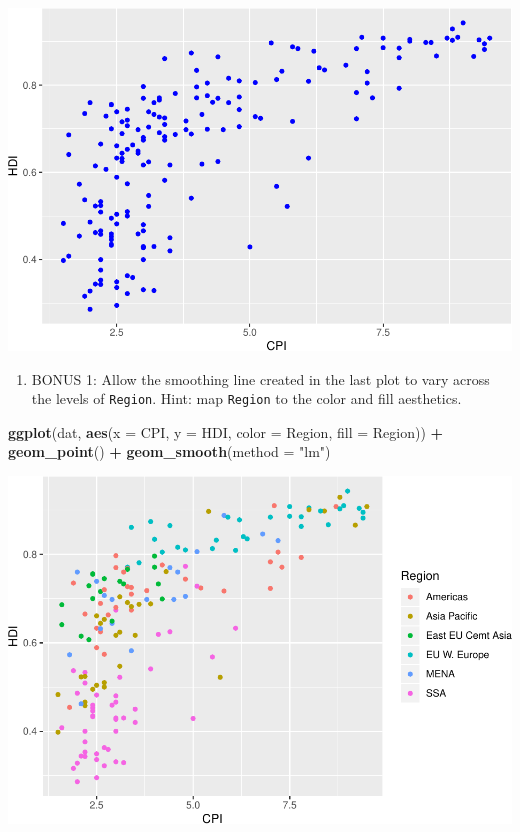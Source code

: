 \documentclass[
]{book}
\newenvironment{Shaded}{\begin{snugshade}}{\end{snugshade}}
\newcommand{\DataTypeTok}[1]{\textcolor[rgb]{0.13,0.29,0.53}{#1}}
\newcommand{\KeywordTok}[1]{\textcolor[rgb]{0.13,0.29,0.53}{\textbf{#1}}}
\newcommand{\NormalTok}[1]{#1}
\newcommand{\OperatorTok}[1]{\textcolor[rgb]{0.81,0.36,0.00}{\textbf{#1}}}
\newcommand{\StringTok}[1]{\textcolor[rgb]{0.31,0.60,0.02}{#1}}
\providecommand{\tightlist}{%
  \setlength{\itemsep}{0pt}\setlength{\parskip}{0pt}}
\begin{document}
\includegraphics{R/Rgraphics/figures/unnamed-chunk-195-1.pdf}

\begin{enumerate}
\def\labelenumi{\arabic{enumi}.}
\setcounter{enumi}{4}
\tightlist
\item
  BONUS 1: Allow the smoothing line created in the last plot to vary across the levels of \texttt{Region}. Hint: map \texttt{Region} to the color and fill aesthetics.
\end{enumerate}

\begin{Shaded}
\begin{Highlighting}[]
\KeywordTok{ggplot}\NormalTok{(dat, }\KeywordTok{aes}\NormalTok{(}\DataTypeTok{x =}\NormalTok{ CPI, }\DataTypeTok{y =}\NormalTok{ HDI, }\DataTypeTok{color =}\NormalTok{ Region, }\DataTypeTok{fill =}\NormalTok{ Region)) }\OperatorTok{+}
\StringTok{  }\KeywordTok{geom\_point}\NormalTok{() }\OperatorTok{+}
\StringTok{  }\KeywordTok{geom\_smooth}\NormalTok{(}\DataTypeTok{method =} \StringTok{"lm"}\NormalTok{)}
\end{Highlighting}
\end{Shaded}

\includegraphics{R/Rgraphics/figures/unnamed-chunk-196-1.pdf}
\end{document}
